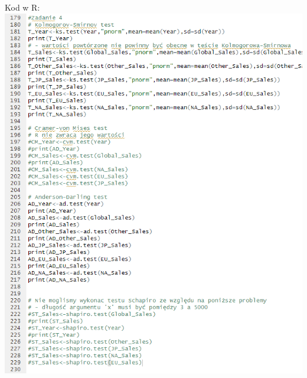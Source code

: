 \documentclass[12pt]{article}
\begin{document}
	Kod w R:\\
	\includegraphics[scale=0.5]{Zad4}
	\newpage
	
\end{document}
